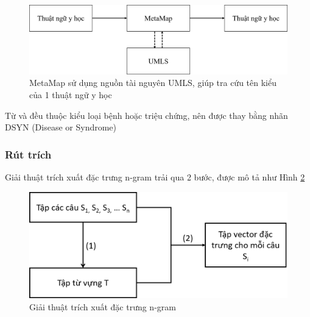 \begin{figure}[H]
\centering
\includegraphics[scale=0.32]{../hinh/metamap.png}
\caption{MetaMap sử dụng nguồn tài nguyên UMLS, giúp tra cứu tên kiểu của 1 thuật ngữ y học}
\label{fig:metamap}
\end{figure}
Từ {} và {} đều thuộc kiểu loại bệnh hoặc triệu chứng, nên được thay bằng nhãn DSYN (Disease or Syndrome)
\subsubsection*{Rút trích}
Giải thuật trích xuất đặc trưng n-gram trải qua 2 bước, được mô tả như Hình \ref{fig:mo-hinh-ngram}\\
\begin{figure}[H]
\centering
\includegraphics[scale=0.30]{../hinh/mo-hinh-ngram.png}
\caption{Giải thuật trích xuất đặc trưng n-gram} \label{fig:mo-hinh-ngram}
\end{figure}


